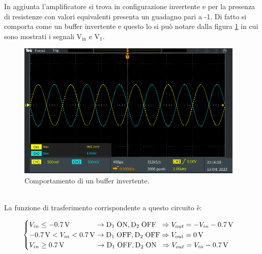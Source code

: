 \documentclass{report}
\begin{document}
In aggiunta l'amplificatore si trova in configurazione invertente e per la presenza di resistenze con valori equivalenti presenta un guadagno pari a -1. Di fatto si comporta come un buffer invertente e questo lo si può notare dalla figura \ref{figura:TEK00023} in cui sono mostrati i segnali $\displaystyle\mathrm{V_{in}}$ e $\displaystyle\mathrm{V_{1}}$.
\begin{figure}[h]
	\centering
	\includegraphics[height=6.5cm]{immagini/TEK00023}
	\caption{Comportamento di un buffer invertente.}
	\label{figura:TEK00023}
\end{figure}
\\La funzione di trasferimento corrispondente a questo circuito è:

\begin{equation}
   \begin{cases}
   V_{in}\le \SI{-0.7}{\volt}\;\;\indent\indent\rightarrow \mathrm{D_1\; ON, D_2\;OFF}\;\; \Rightarrow V_{out} = -V_{in}-\SI{0.7}{\volt}\\
  \SI{-0.7}{\volt} < V_{in}< \SI{0.7}{\volt}\rightarrow \mathrm{D_1\; OFF, D_2\;OFF} \Rightarrow V_{out} = \SI{0}{\volt}\\
   V_{in}\ge \SI{0.7}{\volt}\;\;\;\;\;\indent\indent\rightarrow \mathrm{D_1\; OFF, D_2\;ON}\;\; \Rightarrow V_{out} = V_{in}-\SI{0.7}{\volt}
   \end{cases}
\end{equation}
\end{document}
